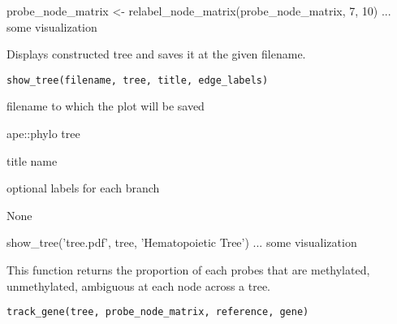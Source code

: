 \documentclass[a4paper]{book}
\begin{document}
%
\begin{Examples}
\begin{ExampleCode}
probe_node_matrix <- relabel_node_matrix(probe_node_matrix, 7, 10)
... some visualization 
\end{ExampleCode}
\end{Examples}
%
\begin{Description}\relax
Displays constructed tree and saves it at the given filename.
\end{Description}
%
\begin{Usage}
\begin{verbatim}
show_tree(filename, tree, title, edge_labels)
\end{verbatim}
\end{Usage}
%
\begin{Arguments}
\begin{ldescription}
\item[\code{filename}] filename to which the plot will be saved

\item[\code{tree}] ape::phylo tree

\item[\code{title}] title name

\item[\code{edge\_labels}] optional labels for each branch
\end{ldescription}
\end{Arguments}
%
\begin{Value}
None
\end{Value}
%
\begin{Examples}
\begin{ExampleCode}
show_tree('tree.pdf', tree, 'Hematopoietic Tree')
... some visualization 
\end{ExampleCode}
\end{Examples}
%
\begin{Description}\relax
This function returns the proportion of each probes that are methylated, 
unmethylated, ambiguous at each node across a tree.
\end{Description}
%
\begin{Usage}
\begin{verbatim}
track_gene(tree, probe_node_matrix, reference, gene)
\end{verbatim}
\end{Usage}
\end{document}

